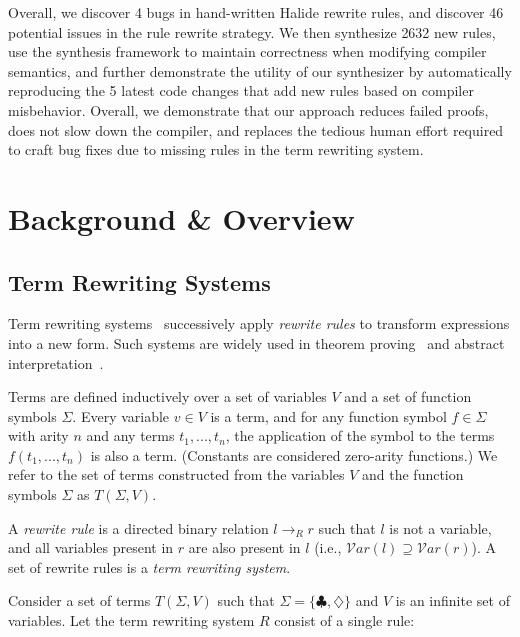 \documentclass[acmsmall,review,anonymous]{acmart}\settopmatter{printfolios=true,printccs=false,printacmref=false}
\newcommand{\NumRulesFixed}{{\color{black} 4}\xspace}
\newcommand{\NumOrderingProblems}{{\color{black} 46}\xspace}
\newcommand{\NumRulesSynthesized}{{\color{black} 2632}\xspace}
\newcommand{\NumBugsAutomated}{{\color{black} 5}\xspace}
\begin{document}
Overall, we discover \NumRulesFixed bugs in hand-written Halide rewrite rules, and discover \NumOrderingProblems
potential issues in the rule rewrite strategy.  We then synthesize \NumRulesSynthesized new rules, use the
synthesis framework to maintain correctness when modifying compiler semantics,
and further demonstrate the utility of our synthesizer by 
automatically reproducing the \NumBugsAutomated latest code changes that add new
rules based on compiler misbehavior.
Overall, we demonstrate that our approach
reduces failed proofs,  does not slow down the compiler, and replaces the
tedious human effort required to craft bug fixes due to missing rules in the
term rewriting system.

\section{Background \& Overview}
\subsection{Term Rewriting Systems}
Term rewriting systems~\cite{gorn1967} successively apply \textit{rewrite rules} to transform expressions into a new form.  Such systems are widely
used in theorem proving~\cite{baader1999term} and abstract interpretation~\cite{cousot1977abstract, cousot1979systematic}.

Terms are defined inductively over a set of variables $V$ and a set of function symbols $\Sigma$. Every variable $v \in V$ is a term, and for any function symbol $f \in \Sigma$ with arity $n$ and any terms $t_1, ..., t_n$, the application of the symbol to the terms $f(t_1, ..., t_n)$ is also a term. (Constants are considered zero-arity functions.) We refer to the set of terms constructed from the variables $V$ and the function symbols $\Sigma$ as $T(\Sigma, V)$.

A \emph{rewrite rule} is a directed binary relation $l \rightarrow_R r$ such that $l$ is not a variable, and all variables present in $r$ are also present in $l$ (i.e., $\mathcal{V}ar(l) \supseteq \mathcal{V}ar(r)$). A set of rewrite rules is a \emph{term rewriting system}.

Consider a set of terms $T(\Sigma, V)$ such that $\Sigma = \{\clubsuit, \diamondsuit\}$ and $V$ is an infinite set of variables. Let the term rewriting system $R$ consist of a single rule:
\end{document}
